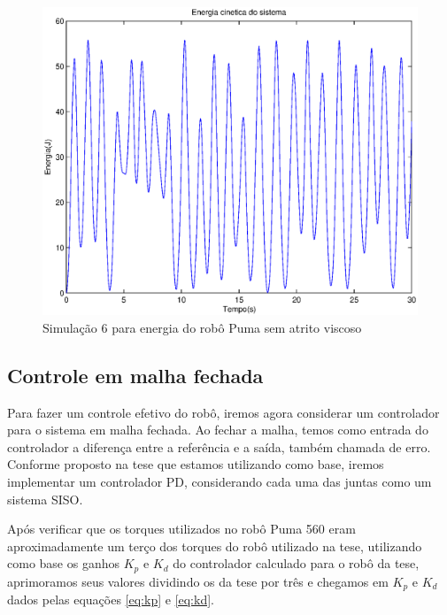 \documentclass{article}
\begin{document}
\begin{figure}[H]
	\centering
	\includegraphics[width=0.8\linewidth]{../longsims/sime2kin.eps}
	\caption{Simulação 6 para energia do robô Puma sem atrito viscoso}
	\label{fig:energysim6nf}
\end{figure}


\subsection{Controle em malha fechada}
Para fazer um controle efetivo do robô, iremos agora considerar um controlador para o sistema em malha fechada. Ao fechar a malha, temos como entrada do controlador a diferença entre a referência e a saída, também chamada de erro. Conforme proposto na tese\cite{bb:tese} que estamos utilizando como base, iremos implementar um controlador PD, considerando cada uma das juntas como um sistema SISO.

Após verificar que os torques utilizados no robô Puma 560 eram aproximadamente um terço dos torques do robô utilizado na tese\cite{bb:tese}, utilizando como base os ganhos $K_p$ e $K_d$ do controlador calculado para o robô da tese, aprimoramos seus valores dividindo os da tese por três e chegamos em $K_p$ e $K_d$ dados pelas equações \ref{eq:kp} e \ref{eq:kd}.
\end{document}
